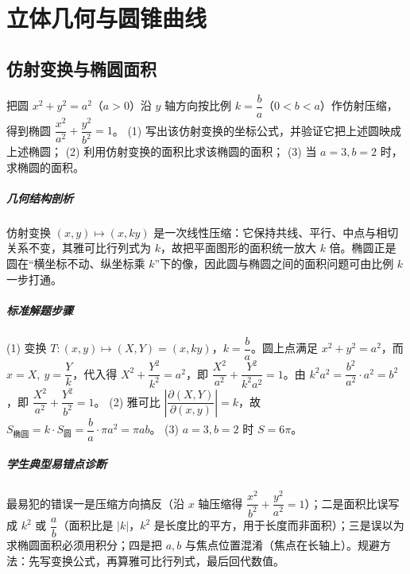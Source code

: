 \chapter{立体几何与圆锥曲线}

\section{仿射变换与椭圆面积}

\begin{problem}
把圆 $x^2+y^2=a^2$（$a>0$）沿 $y$ 轴方向按比例 $k=\dfrac ba$（$0<b<a$）作仿射压缩，得到椭圆 $\dfrac{x^2}{a^2}+\dfrac{y^2}{b^2}=1$。
(1) 写出该仿射变换的坐标公式，并验证它把上述圆映成上述椭圆；
(2) 利用仿射变换的面积比求该椭圆的面积；
(3) 当 $a=3,b=2$ 时，求椭圆的面积。
\end{problem}
\begin{solution}
\paragraph{几何结构剖析}
仿射变换 $(x,y)\mapsto(x,ky)$ 是一次线性压缩：它保持共线、平行、中点与相切关系不变，其雅可比行列式为 $k$，故把平面图形的面积统一放大 $k$ 倍。椭圆正是圆在“横坐标不动、纵坐标乘 $k$”下的像，因此圆与椭圆之间的面积问题可由比例 $k$ 一步打通。
\paragraph{标准解题步骤}
(1) 变换 $T:(x,y)\mapsto(X,Y)=(x,ky)$，$k=\dfrac ba$。圆上点满足 $x^2+y^2=a^2$，而 $x=X,\ y=\dfrac Yk$，代入得 $X^2+\dfrac{Y^2}{k^2}=a^2$，即 $\dfrac{X^2}{a^2}+\dfrac{Y^2}{k^2a^2}=1$。由 $k^2a^2=\dfrac{b^2}{a^2}\cdot a^2=b^2$，即 $\dfrac{X^2}{a^2}+\dfrac{Y^2}{b^2}=1$。
(2) 雅可比 $\left|\dfrac{\partial(X,Y)}{\partial(x,y)}\right|=k$，故 $S_{\text{椭圆}}=k\cdot S_{\text{圆}}=\dfrac ba\cdot\pi a^2=\pi ab$。
(3) $a=3,b=2$ 时 $S=6\pi$。
\paragraph{学生典型易错点诊断}
最易犯的错误一是压缩方向搞反（沿 $x$ 轴压缩得 $\dfrac{x^2}{b^2}+\dfrac{y^2}{a^2}=1$）；二是面积比误写成 $k^2$ 或 $\dfrac ab$（面积比是 $|k|$，$k^2$ 是长度比的平方，用于长度而非面积）；三是误以为求椭圆面积必须用积分；四是把 $a,b$ 与焦点位置混淆（焦点在长轴上）。规避方法：先写变换公式，再算雅可比行列式，最后回代数值。
\end{solution}

